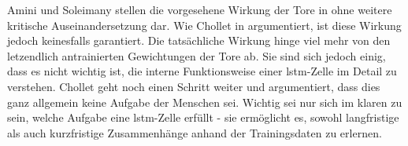 Amini und Soleimany stellen die vorgesehene Wirkung der Tore in \cite{6S191RNN} ohne weitere kritische Auseinandersetzung dar.
Wie Chollet in \cite[S. 263]{DeepLearningPythonKeras} argumentiert, ist diese Wirkung jedoch keinesfalls garantiert.
Die tatsächliche Wirkung hinge viel mehr von den letzendlich antrainierten Gewichtungen der Tore ab.
Sie sind sich jedoch einig, dass es nicht wichtig ist, die interne Funktionsweise einer \acrshort{lstm}-Zelle im Detail zu verstehen.
Chollet geht noch einen Schritt weiter und argumentiert, dass dies ganz allgemein keine Aufgabe der Menschen sei.
Wichtig sei nur sich im klaren zu sein, welche Aufgabe eine \acrshort{lstm}-Zelle erfüllt - sie ermöglicht es, sowohl langfristige als auch kurzfristige Zusammenhänge anhand der Trainingsdaten zu erlernen.

